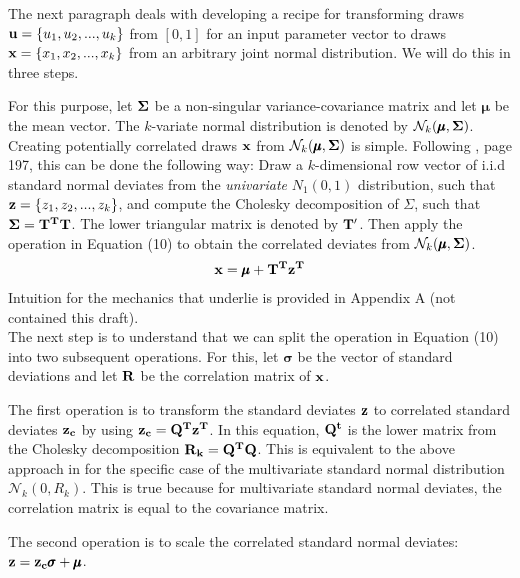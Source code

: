 \documentclass[a4paper,12pt]{article}
\begin{document}
\noindent
The next paragraph deals with developing a recipe for transforming draws $\bold{u} = \{u_1, u_2, ..., u_k\}$ from $[0,1]$ for an input parameter vector to draws $\bold{x} = \{x_1, x_2, ..., x_k\}$ from an arbitrary joint normal distribution. We will do this in three steps. 

For this purpose, let $\bold{\Sigma}$ be a non-singular variance-covariance matrix and let $\pmb{\mu}$ be the mean vector. The $k$-variate normal distribution is denoted by $\mathcal{N}_k(\pmb{\mu}, \bold{\Sigma})$. \\

\noindent
Creating potentially correlated draws $\bold{x}$ from $\mathcal{N}_k(\pmb{\mu}, \bold{\Sigma})$ is simple. Following \cite{gentle2006random}, page 197, this can be done the following way: Draw a $k$-dimensional row vector of i.i.d standard normal deviates from the \textit{univariate} $N_1(0,1)$ distribution, such that  $\bold{z} = \{z_1, z_2, ..., z_k\}$, and compute the Cholesky decomposition of $\Sigma$, such that $\bold{\Sigma} = \bold{T^T T}$. The lower triangular matrix is denoted by $\bold{T'}$. Then apply the operation in Equation (10) to obtain the correlated deviates from $\mathcal{N}_k(\pmb{\mu}, \bold{\Sigma})$.
\begin{align}
\bold{x} = \pmb{\mu} + \bold{T^T z^T} 
\end{align}
Intuition for the mechanics  that underlie is provided in Appendix A (not contained this draft). \\

\noindent
The next step is to understand that we can split the operation in Equation (10) into two subsequent operations. For this, let $\pmb{\sigma}$ be the vector of standard deviations and let $\bold{R}$ be the correlation matrix of $\bold{x}$.

The first operation is to transform the standard deviates $\bold{z}$ to correlated standard deviates $\bold{z_c}$ by using $\bold{z_c}=\bold{Q^T z^T}$. In this equation, $\bold{Q^t}$ is the lower matrix from the Cholesky decomposition $\bold{R_k}=\bold{Q^T Q}$. This is equivalent to the above approach in \cite{gentle2006random} for the specific case of the multivariate standard normal distribution $\mathcal{N}_k(0, R_k)$. This is true because for multivariate standard normal deviates, the correlation matrix is equal to the covariance matrix.

The second operation is to scale the correlated standard normal deviates: $\bold{z}=\bold{z_c}\pmb{\sigma} + \pmb{\mu}$.\\
\end{document}
